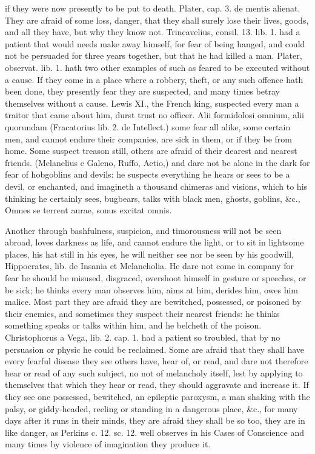 {if they were now presently to be put to death. Plater, cap. 3. de
mentis alienat. They are afraid of some loss, danger, that they shall
surely lose their lives, goods, and all they have, but why they know
not. Trincavelius, consil. 13. lib. 1. had a patient that would needs
make away himself, for fear of being hanged, and could not be persuaded
for three years together, but that he had killed a man. Plater,
observat. lib. 1. hath two other examples of such as feared to be
executed without a cause. If they come in a place where a robbery,
theft, or any such offence hath been done, they presently fear they are
suspected, and many times betray themselves without a cause. Lewis XI.,
the French king, suspected every man a traitor that came about him,
durst trust no officer. Alii formidolosi omnium, alii quorundam
(Fracatorius lib. 2. de Intellect.) some fear all alike, some
certain men, and cannot endure their companies, are sick in them, or if
they be from home. Some suspect treason still, others are afraid
of their dearest and nearest friends. (Melanelius e Galeno,
Ruffo, Aetio,) and dare not be alone in the dark for fear of hobgoblins
and devils: he suspects everything he hears or sees to be a devil, or
enchanted, and imagineth a thousand chimeras and visions, which to his
thinking he certainly sees, bugbears, talks with black men, ghosts,
goblins, \&c., Omnes se terrent aurae, sonus excitat omnis.

Another through bashfulness, suspicion, and timorousness will not be
seen abroad, loves darkness as life, and cannot endure the light,
or to sit in lightsome places, his hat still in his eyes, he will
neither see nor be seen by his goodwill, Hippocrates, lib. de Insania
et Melancholia. He dare not come in company for fear he should be
misused, disgraced, overshoot himself in gesture or speeches, or be
sick; he thinks every man observes him, aims at him, derides him, owes
him malice. Most part they are afraid they are bewitched,
possessed, or poisoned by their enemies, and sometimes they suspect
their nearest friends: he thinks something speaks or talks within him,
and he belcheth of the poison. Christophorus a Vega, lib. 2. cap. 1.
had a patient so troubled, that by no persuasion or physic he could be
reclaimed. Some are afraid that they shall have every fearful disease
they see others have, hear of, or read, and dare not therefore hear or
read of any such subject, no not of melancholy itself, lest by applying
to themselves that which they hear or read, they should aggravate and
increase it. If they see one possessed, bewitched, an epileptic
paroxysm, a man shaking with the palsy, or giddy-headed, reeling or
standing in a dangerous place, \&c., for many days after it runs in
their minds, they are afraid they shall be so too, they are in like
danger, as Perkins c. 12. sc. 12. well observes in his Cases of
Conscience and many times by violence of imagination they produce it.

}

